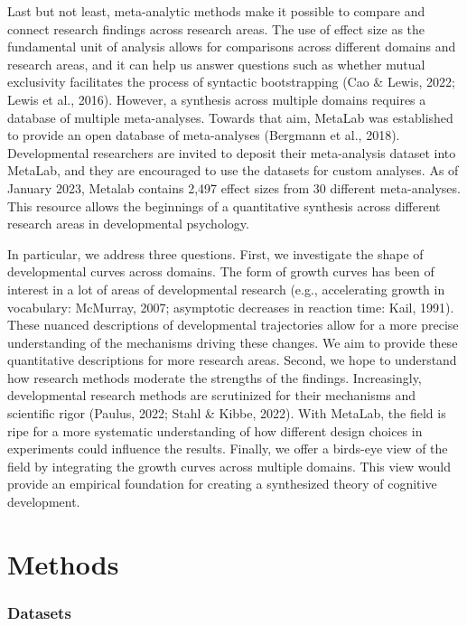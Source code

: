 \documentclass[10pt, letterpaper]{article}
\begin{document}
Last but not least, meta-analytic methods make it possible to compare
and connect research findings across research areas. The use of effect
size as the fundamental unit of analysis allows for comparisons across
different domains and research areas, and it can help us answer
questions such as whether mutual exclusivity facilitates the process of
syntactic bootstrapping (Cao \& Lewis, 2022; Lewis et al., 2016).
However, a synthesis across multiple domains requires a database of
multiple meta-analyses. Towards that aim, MetaLab was established to
provide an open database of meta-analyses (Bergmann et al., 2018).
Developmental researchers are invited to deposit their meta-analysis
dataset into MetaLab, and they are encouraged to use the datasets for
custom analyses. As of January 2023, Metalab contains 2,497 effect sizes
from 30 different meta-analyses. This resource allows the beginnings of
a quantitative synthesis across different research areas in
developmental psychology.

In particular, we address three questions. First, we investigate the
shape of developmental curves across domains. The form of growth curves
has been of interest in a lot of areas of developmental research (e.g.,
accelerating growth in vocabulary: McMurray, 2007; asymptotic decreases
in reaction time: Kail, 1991). These nuanced descriptions of
developmental trajectories allow for a more precise understanding of the
mechanisms driving these changes. We aim to provide these quantitative
descriptions for more research areas. Second, we hope to understand how
research methods moderate the strengths of the findings. Increasingly,
developmental research methods are scrutinized for their mechanisms and
scientific rigor (Paulus, 2022; Stahl \& Kibbe, 2022). With MetaLab, the
field is ripe for a more systematic understanding of how different
design choices in experiments could influence the results. Finally, we
offer a birds-eye view of the field by integrating the growth curves
across multiple domains. This view would provide an empirical foundation
for creating a synthesized theory of cognitive development.

\hypertarget{methods}{%
\section{Methods}\label{methods}}

\hypertarget{datasets}{%
\subsubsection{Datasets}\label{datasets}}
\end{document}

